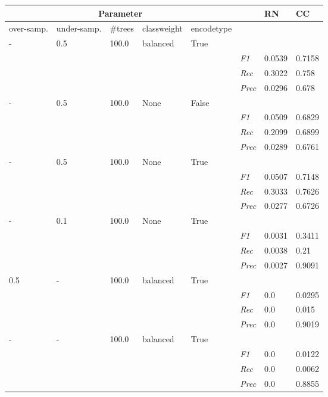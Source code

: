 \begin{table}[]
\tiny
\tabcolsep=0.11cm
\begin{tabularx}{\textwidth}{XXXXX|X|X|X}
\toprule
\multicolumn{5}{c}{Parameter} & & RN &  CC \\ \midrule
over-\newline samp. & under-\newline samp. & \#trees & class\newline weight & encode\newline type  & & & \\ \midrule
- & 0.5 & 100.0 & balanced & True & &  \\
& & & & & \textit{F1} & 0.0539 & 0.7158        \\
& & & & & \textit{Rec} &  0.3022 & 0.758    \\
& & & & & \textit{Prec} & 0.0296 & 0.678  \\ \midrule
- & 0.5 & 100.0 & None & False & &  \\
& & & & & \textit{F1} & 0.0509 & 0.6829        \\
& & & & & \textit{Rec} &  0.2099 & 0.6899    \\
& & & & & \textit{Prec} & 0.0289 & 0.6761  \\ \midrule
- & 0.5 & 100.0 & None & True & &  \\
& & & & & \textit{F1} & 0.0507 & 0.7148        \\
& & & & & \textit{Rec} &  0.3033 & 0.7626    \\
& & & & & \textit{Prec} & 0.0277 & 0.6726  \\ \midrule
- & 0.1 & 100.0 & None & True & &  \\
& & & & & \textit{F1} & 0.0031 & 0.3411        \\
& & & & & \textit{Rec} &  0.0038 & 0.21    \\
& & & & & \textit{Prec} & 0.0027 & 0.9091  \\ \midrule
0.5 & - & 100.0 & balanced & True & &  \\
& & & & & \textit{F1} & 0.0 & 0.0295        \\
& & & & & \textit{Rec} &  0.0 & 0.015    \\
& & & & & \textit{Prec} & 0.0 & 0.9019  \\ \midrule
- & - & 100.0 & balanced & True & &  \\
& & & & & \textit{F1} & 0.0 & 0.0122        \\
& & & & & \textit{Rec} &  0.0 & 0.0062    \\
& & & & & \textit{Prec} & 0.0 & 0.8855  \\ \midrule

\end{tabularx}
\end{table}
